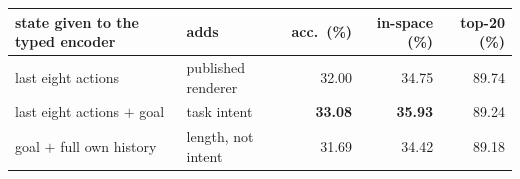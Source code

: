 {\setlength{\tabcolsep}{4.5pt}\begin{tabular}{llrrr}\toprule
state given to the typed encoder & adds & acc.\ (\%) & in-space (\%) & top-20 (\%) \\\midrule
last eight actions & published renderer & 32.00 & 34.75 & 89.74 \\
last eight actions $+$ goal & task intent & \textbf{33.08} & \textbf{35.93} & 89.24 \\
goal $+$ full own history & length, not intent & 31.69 & 34.42 & 89.18 \\
\bottomrule\end{tabular}}

